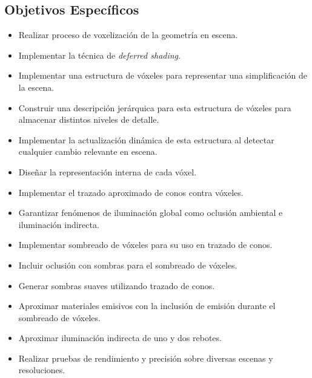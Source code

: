 \subsection*{Objetivos Específicos} %
\label{sub:objetivo_especifico}
\begin{itemize}
\item Realizar proceso de voxelización de la geometría en escena.
\item Implementar la técnica de \emph{deferred shading}.
\item Implementar una estructura de vóxeles para representar una simplificación de la escena.
\item Construir una descripción jerárquica para esta estructura de vóxeles para almacenar distintos niveles de detalle.
\item Implementar la actualización dinámica de esta estructura al detectar cualquier cambio relevante en escena.
\item Diseñar la representación interna de cada vóxel.
\item Implementar el trazado aproximado de conos contra vóxeles.
\item Garantizar fenómenos de iluminación global como oclusión ambiental e iluminación indirecta.
\item Implementar sombreado de vóxeles para su uso en trazado de conos.
\item Incluir oclusión con sombras para el sombreado de vóxeles.
\item Generar sombras suaves utilizando trazado de conos.
\item Aproximar materiales emisivos con la inclusión de emisión durante el sombreado de vóxeles.
\item Aproximar iluminación indirecta de uno y dos rebotes.
\item Realizar pruebas de rendimiento y precisión sobre diversas escenas y resoluciones.
\end{itemize}
